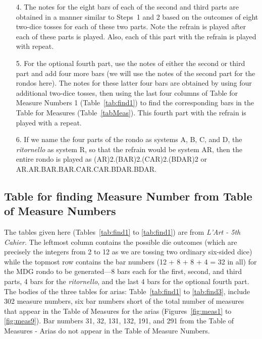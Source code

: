 \documentclass[a4paper,x11names,svgnames,10pt]{article}
\begin{document}
{\begin{enumerate}
	\item[4.] The notes for the eight bars of each of the second and third parts are obtained in a manner similar to Steps~1 and 2 based on the outcomes of eight two-dice tosses for each of these two parts. Note the refrain is played after each of these parts is played. Also, each of this part with the refrain is played with repeat. 
	
	\item[5.] For the optional fourth part, use the notes of either the second or third part and add four more bars (we will use the notes of the second part for the rondos here).  The notes for these latter four bars are obtained by using four additional two-dice tosses, then using the last four columns of Table for Measure Numbers 1 (Table~\ref{tab:find1}) to find the corresponding bars in the  Table for Measures (Table~\ref{tabMeas}). This fourth part with the refrain is played with a repeat.
	
	\item[6.] If we name the four parts of the rondo as systems A, B, C, and D, the {\it ritornello} as system R, so that the refrain would be system AR, then the entire rondo is played as (AR)2.(BAR)2.(CAR)2.(BDAR)2 or  AR.AR.BAR.BAR.CAR.CAR.BDAR.BDAR.
	
\end{enumerate}   

\subsection{Table for finding Measure Number from Table of Measure Numbers}\label{tabFind}
The tables given here (Tables~\ref{tab:find1} to \ref{tab:find1}) are from {\em L'Art - 5th Cahier}.  The leftmost column contains the possible die outcomes (which are precisely the integers from 2 to 12 as we are tossing two ordinary six-sided dice) while the topmost row contains the bar numbers (12 + 8 + 8 + 4 = 32 in all) for the MDG rondo to be generated---8 bars each for the first, second, and third parts, 4 bars for the {\it ritornello}, and the last 4 bars for the optional fourth part.\\

The bodies of the three tables for arias: Table~\ref{tab:find1} to \ref{tab:find3},  include 302 measure numbers, six bar numbers short of the total number of measures that appear in the Table of Measures for the arias (Figures~\ref{fig:meas1} to \ref{fig:meas9}). Bar numbers 31, 32, 131, 132, 191, and 291 from the Table of Measures - Arias do not appear in the Table of Measure Numbers.\\

}
\end{document}
